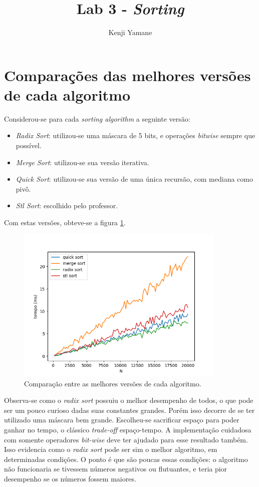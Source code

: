 \documentclass{article}[twocolumn]
\title{Lab 3 - \textit{Sorting}}
\author{Kenji Yamane}
\begin{document}
	\maketitle
	\section{Compara\c{c}\~oes das melhores vers\~oes de cada algoritmo}
	Considerou-se para cada \textit{sorting algorithm} a seguinte vers\~ao:
	\begin{itemize}
		\item \textit{Radix Sort}: utilizou-se uma m\'ascara de 5 bits, e opera\c{c}\~oes
		\textit{bitwise} sempre que poss\'ivel.
		\item \textit{Merge Sort}: utilizou-se sua vers\~ao iterativa.
		\item \textit{Quick Sort}: utilizou-se sua vers\~ao de uma \'unica recurs\~ao, com mediana
		como piv\^o.
		\item \textit{Stl Sort}: escolhido pelo professor.
	\end{itemize}
	Com estas vers\~oes, obteve-se a figura \ref{fig:overall}.
	\begin{figure}[H]
		\centering
		\includegraphics[width=10cm]{overall.png}
		\caption{Compara\c{c}\~ao entre as melhores vers\~oes de cada algoritmo.}
		\label{fig:overall}
	\end{figure}
	Observa-se como o \textit{radix sort} possuiu o melhor desempenho de todos, o que pode ser
	um pouco curioso dadas suas constantes grandes. Por\'em isso decorre de se ter utilizado
	uma m\'ascara bem grande. Escolheu-se sacrificar espa\c{c}o para poder ganhar no tempo,
	o cl\'assico \textit{trade-off} espa\c{c}o-tempo. A implementa\c{c}\~ao cuidadosa com somente
	operadores \textit{bit-wise} deve ter ajudado para esse resultado tamb\'em. Isso evidencia
	como o \textit{radix sort} pode ser sim o melhor algoritmo, em determinadas condi\c{c}\~oes.
	O ponto \'e que s\~ao poucas essas condi\c{c}\~oes: o algoritmo n\~ao funcionaria se tivessem
	n\'umeros negativos ou flutuantes, e teria pior desempenho se os n\'umeros fossem maiores.
\end{document}
